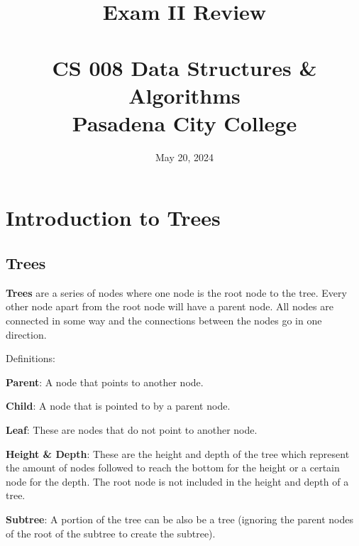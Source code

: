 \documentclass[11pt,a4paper,english]{report}
\begin{document}
\title{Exam II Review \\ \hfill \\ \normalsize CS 008 Data Structures \& Algorithms \\ \normalsize Pasadena City College}
\date{May 20, 2024}
\maketitle

\tableofcontents\label{sec:contents}


\chapter{Introduction to Trees}
\section{Trees}

\textbf{Trees} are a series of nodes where one node is the root node to the tree. Every other node apart from the root node will have a parent node. All nodes are connected in some way and the connections between the nodes go in one direction.

\bigskip
\begin{bluebox}{Definitions:}{

  \begin{itemize} {

      \item \textbf{Parent}: A node that points to another node.
      \item \textbf{Child}: A node that is pointed to by a parent node.
      \item \textbf{Leaf}: These are nodes that do not point to another node.
      \item \textbf{Height \& Depth}: These are the height and depth of the tree which represent the amount of nodes followed to reach the bottom for the height or a certain node for the depth. The root node is not included in the height and depth of a tree.
      \item \textbf{Subtree}: A portion of the tree can be also be a tree (ignoring the parent nodes of the root of the subtree to create the subtree).

  }\end{itemize}

}\end{bluebox}
\end{document}
